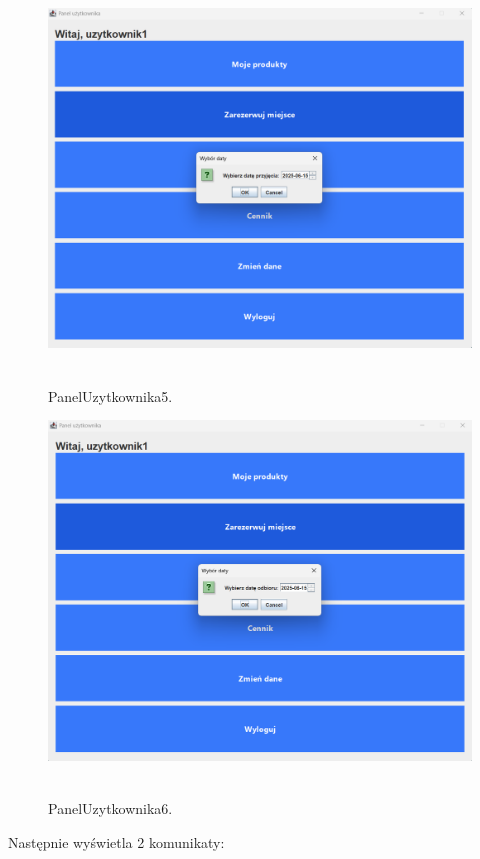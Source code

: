 \begin{figure}[H]
    \centering
    \includegraphics[width=.9\linewidth]{figures/PanelUzytkownika5.png}\
    \caption{PanelUzytkownika5.\label{PanelUzytkownika5}}
\end{figure}

\begin{figure}[H]
    \centering
    \includegraphics[width=.9\linewidth]{figures/PanelUzytkownika6.png}\
    \caption{PanelUzytkownika6.\label{PanelUzytkownika6}}
\end{figure}

Następnie wyświetla 2 komunikaty:


